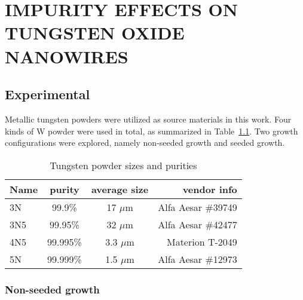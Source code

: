 
\chapter{IMPURITY EFFECTS ON TUNGSTEN OXIDE NANOWIRES}



\section{Experimental}
Metallic tungsten powders were utilized as source materials in this work. Four kinds of W powder were used in total, as summarized in Table~\ref{tab:powder}. Two growth configurations were explored, namely non-seeded growth and seeded growth.
\begin{table}[htb]
\centering
\caption{Tungsten powder sizes and purities}\label{tab:powder}
\begin{tabular}{lccr}
\toprule
Name & purity & average size & vendor info\\
\midrule
3N   &  99.9\% & 17 $\mu$m & Alfa Aesar \#39749\\
3N5   &  99.95\% & 32 $\mu$m  & Alfa Aesar \#42477\\
4N5   &  99.995\% & 3.3 $\mu$m  & Materion T-2049 \\
5N   &  99.999\% & 1.5 $\mu$m & Alfa Aesar \#12973\\
\bottomrule
\end{tabular}
\end{table}

\subsection{Non-seeded growth}\label{sec:woxnonseed}

